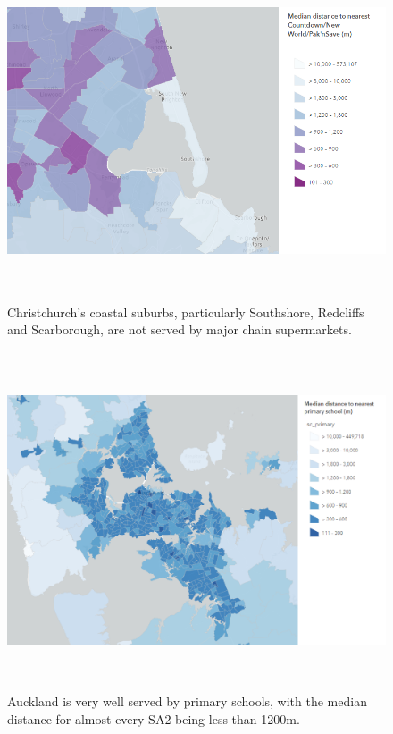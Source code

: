 \documentclass[12pt,a4paper]{article}
\begin{document}
\begin{figure}[!htbp]
	\begin{center}
		\includegraphics[height=100mm]{./figures/christchurch_supermarkets.png}
		\caption{\centering Christchurch's coastal suburbs, particularly Southshore, Redcliffs and Scarborough, are not served by major chain supermarkets.}
		\label{fig:chch_sm}
	\end{center}
\end{figure}

\begin{figure}[!htbp]
	\begin{center}
		\includegraphics[height=100mm]{./figures/auckland_primary_schools.png}
		\caption{\centering Auckland is very well served by primary schools, with the median distance for almost every SA2 being less than 1200m.}
		\label{fig:akl_primschools}
	\end{center}
\end{figure}
\end{document}
